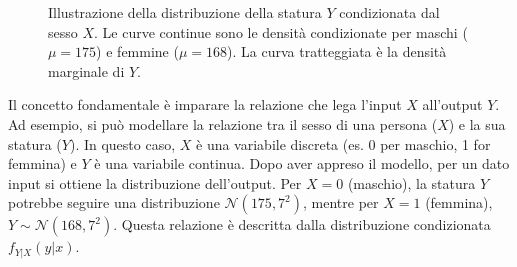 \begin{figure}[ht]
\centering
{}
\caption{Illustrazione della distribuzione della statura \(Y\) condizionata dal sesso \(X\). Le curve continue sono le densità condizionate per maschi (\(\mu=175\)) e femmine (\(\mu=168\)). La curva tratteggiata è la densità marginale di \(Y\).}
\label{fig:distribuzione-mista-gauss}
\end{figure}

Il concetto fondamentale è imparare la relazione che lega l'input \(X\) all'output \(Y\). Ad esempio, si può modellare la relazione tra il sesso di una persona (\(X\)) e la sua statura (\(Y\)). In questo caso, \(X\) è una variabile discreta (es. 0 per maschio, 1 for femmina) e \(Y\) è una variabile continua. Dopo aver appreso il modello, per un dato input si ottiene la distribuzione dell'output. Per \(X=0\) (maschio), la statura \(Y\) potrebbe seguire una distribuzione \(\mathcal{N}(175, 7^2)\), mentre per \(X=1\) (femmina), \(Y \sim \mathcal{N}(168, 7^2)\). Questa relazione è descritta dalla distribuzione condizionata \(f_{Y|X}(y|x)\).

